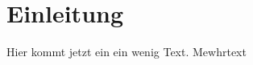 \chapter{Einleitung}

\seChaptersWithoutNewpage{}

Hier kommt jetzt ein ein wenig Text. Mewhrtext

\seChapterEndSkip{}